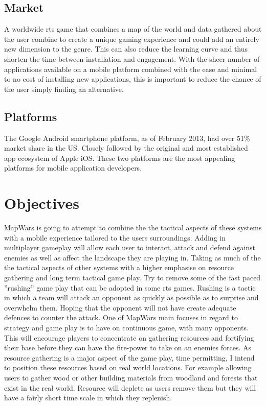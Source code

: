 \subsection{Market}

A worldwide \gls{rts} game that combines a map of the world and data gathered about the user combine to create a unique gaming experience and could add an entirely new dimension to the genre. This can also reduce the learning curve and thus shorten the time between installation and engagement. With the sheer number of applications available on a mobile platform combined with the ease and minimal to no cost of installing new applications, this is important to reduce the chance of the user simply finding an alternative.


\subsection{Platforms}
The Google Android smartphone platform, as of February 2013, had over 51\% market share in the US\cite{smartphone_market}. Closely followed by the original and most established app ecosystem of Apple iOS. These two platforms are the most appealing platforms for mobile application developers.


\section{Objectives}
MapWars is going to attempt to combine the the tactical aspects of these systems with a mobile experience tailored to the users surroundings. Adding in multiplayer gameplay will allow each user to interact, attack and defend against enemies as well as affect the landscape they are playing in. Taking as much of the the tactical aspects of other systems with a higher emphasise on resource gathering and long term tactical game play. Try to remove some of the fast paced ”rushing” game play that can be adopted in some \gls{rts} games. Rushing is a tactic in which a team will attack an opponent as quickly as possible as to surprise and overwhelm them. Hoping that the opponent will not have create adequate defences to counter the attack. One of MapWars main focuses in regard to strategy and game play is to have on continuous game, with many opponents. This will encourage players to concentrate on gathering resources and fortifying their base before they can have the fire-power to take on an enemies forces. As resource gathering is a major aspect of the game play, time permitting, I intend to position these resources based on real world locations. For example allowing users to gather wood or other building materials from woodland and forests that exist in the real world. Resource will deplete as users remove them but they will have a fairly short time scale in which they replenish.